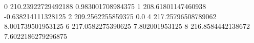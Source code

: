 0 210.23922729492188 0.983001708984375
1 208.61801147460938 -0.638214111328125
2 209.2562255859375 0.0
4 217.25796508789062 8.001739501953125
6 217.0582275390625 7.802001953125
8 216.8584442138672 7.6022186279296875
